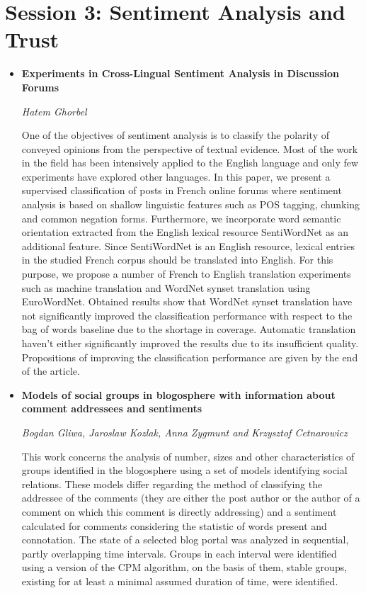 \section{Session 3: Sentiment Analysis and Trust}
\begin{itemize}

\item \textbf{Experiments in Cross-Lingual Sentiment Analysis in Discussion
Forums}

\textit{Hatem Ghorbel}

One of the objectives of sentiment analysis is to classify the polarity of
conveyed opinions from the perspective of textual evidence. Most of the work in
the field has been intensively applied to the English language and only few
experiments have explored other languages. In this paper, we present a
supervised classification of posts in French online forums where sentiment
analysis is based on shallow linguistic features such as POS tagging, chunking
and common negation forms. Furthermore, we incorporate word semantic orientation
extracted from the English lexical resource SentiWordNet as an additional
feature. Since SentiWordNet is an English resource, lexical entries in the
studied French corpus should be translated into English. For this purpose, we
propose a number of French to English translation experiments such as machine
translation and WordNet synset translation using EuroWordNet. Obtained results
show that WordNet synset translation have not significantly improved the
classification performance with respect to the bag of words baseline due to the
shortage in coverage. Automatic translation haven't either significantly
improved the results due to its insufficient quality. Propositions of improving
the classification performance are given by the end of the article.

\item \textbf{Models of social groups in blogosphere with information about
comment addressees and sentiments}

\textit{Bogdan Gliwa, Jaroslaw Kozlak, Anna Zygmunt and Krzysztof Cetnarowicz}

This work concerns the analysis of number, sizes and other characteristics of
groups identified in the blogosphere using a set of models identifying social
relations. These models differ regarding the method of classifying the addressee
of the comments (they are either the post author or the author of a comment on
which this comment is directly addressing) and a sentiment calculated for
comments considering the statistic of words present and connotation. The state
of a selected blog portal was analyzed in sequential, partly overlapping time
intervals. Groups in each interval were identified using a version of the CPM
algorithm, on the basis of them, stable groups, existing for at least a minimal
assumed duration of time, were identified.


\end{itemize}
